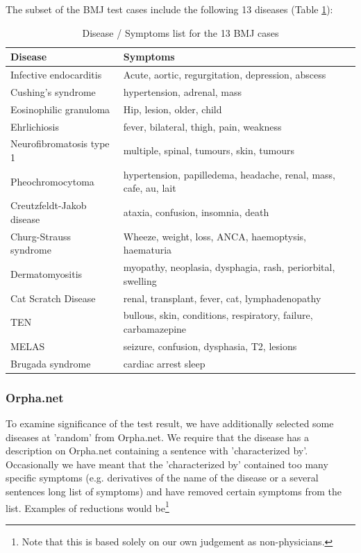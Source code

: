 The subset of the BMJ test cases include the following 13 diseases (Table \ref{BMJCases}):

\begin{table}[H]
  \caption{Disease / Symptoms list for the 13 BMJ cases}
  \label{BMJCases}
  \begin{scriptsize}
  \begin{tabular}{|l|p{7cm}|}
    \hline
    Disease & Symptoms \\
    \hline
    Infective endocarditis & Acute, aortic,  regurgitation, depression,  abscess \\
    \hline
    Cushing's syndrome & hypertension, adrenal, mass \\
    \hline
    Eosinophilic granuloma & Hip, lesion, older, child \\
    \hline
    Ehrlichiosis & fever, bilateral, thigh, pain, weakness \\
    \hline
    Neurofibromatosis type 1 & multiple, spinal, tumours, skin, tumours \\
    \hline
    Pheochromocytoma & hypertension, papilledema, headache, renal, mass, cafe, au, lait \\
    \hline
    Creutzfeldt-Jakob disease & ataxia, confusion, insomnia, death \\
    \hline
    Churg-Strauss syndrome & Wheeze, weight, loss, ANCA, haemoptysis, haematuria \\
    \hline
    Dermatomyositis & myopathy, neoplasia, dysphagia, rash, periorbital, swelling \\
    \hline
    Cat Scratch Disease & renal, transplant, fever, cat, lymphadenopathy \\
    \hline
    TEN & bullous, skin, conditions, respiratory, failure, carbamazepine \\
    \hline
    MELAS & seizure, confusion, dysphasia, T2, lesions \\
    \hline
    Brugada syndrome & cardiac arrest sleep \\
    \hline
  \end{tabular}
  \end{scriptsize}
\end{table}

\subsubsection{Orpha.net}
To examine significance of the test result, we have additionally
selected some diseases at 'random' from Orpha.net. We require that the
disease has a description on Orpha.net containing a sentence with
'characterized by'. Occasionally we have meant that the 'characterized
by' contained too many specific symptoms (e.g. derivatives of the name
of the disease or a several sentences long list of symptoms) and have
removed certain symptoms from the list. Examples of reductions would
be\footnote{Note that this is based solely on our own judgement as
  non-physicians.}

